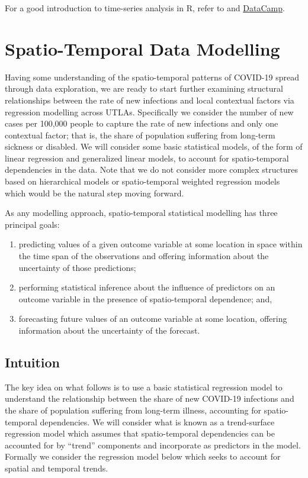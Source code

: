 \documentclass[
]{book}
\begin{document}
For a good introduction to time-series analysis in R, refer to \citet{hyndman2018forecasting} and \href{https://www.datacamp.com/courses/forecasting-using-r}{DataCamp}.

\hypertarget{spatio-temporal-data-modelling}{%
\section{Spatio-Temporal Data Modelling}\label{spatio-temporal-data-modelling}}

Having some understanding of the spatio-temporal patterns of COVID-19 spread through data exploration, we are ready to start further examining structural relationships between the rate of new infections and local contextual factors via regression modelling across UTLAs. Specifically we consider the number of new cases per 100,000 people to capture the rate of new infections and only one contextual factor; that is, the share of population suffering from long-term sickness or disabled. We will consider some basic statistical models, of the form of linear regression and generalized linear models, to account for spatio-temporal dependencies in the data. Note that we do not consider more complex structures based on hierarchical models or spatio-temporal weighted regression models which would be the natural step moving forward.

As any modelling approach, spatio-temporal statistical modelling has three principal goals:

\begin{enumerate}
\def\labelenumi{\arabic{enumi}.}
\item
  predicting values of a given outcome variable at some location in space within the time span of the observations and offering information about the uncertainty of those predictions;
\item
  performing statistical inference about the influence of predictors on an outcome variable in the presence of spatio-temporal dependence; and,
\item
  forecasting future values of an outcome variable at some location, offering information about the uncertainty of the forecast.
\end{enumerate}

\hypertarget{intuition}{%
\subsection{Intuition}\label{intuition}}

The key idea on what follows is to use a basic statistical regression model to understand the relationship between the share of new COVID-19 infections and the share of population suffering from long-term illness, accounting for spatio-temporal dependencies. We will consider what is known as a trend-surface regression model which assumes that spatio-temporal dependencies can be accounted for by ``trend'' components and incorporate as predictors in the model. Formally we consider the regression model below which seeks to account for spatial and temporal trends.
\end{document}
